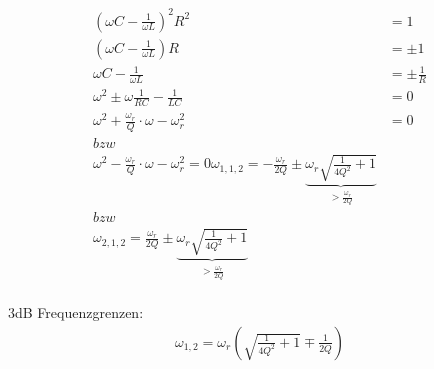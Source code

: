 \begin{align}
	(\omega C-\frac{1}{\omega L})^2R^2 &= 1\nonumber\\
	(\omega C - \frac{1}{\omega L})R &= \pm 1\nonumber\\
	\omega C - \frac{1}{\omega L} &= \pm \frac{1}{R}\nonumber\\
	\omega^2 \pm \omega \frac{1}{RC}-\frac{1}{LC} &= 0\nonumber\\
	\omega^2 + \frac{\omega_r}{Q}\cdot \omega - \omega_r^2&=0 \\ bzw\\ \omega^2 -
	\frac{\omega_r}{Q}\cdot \omega - \omega_r^2=0\nonumber
	\omega_{1,1,2} = -\frac{\omega_r}{2Q} \pm 
	\underbrace{\omega_r\sqrt{\frac{1}{4Q^2}+1}}_{>\frac{\omega_r}{2Q}}
	\\	bzw \\
	\omega_{2,1,2}=\frac{\omega_r}{2Q} \pm
	\underbrace{\omega_r\sqrt{\frac{1}{4Q^2}+1}}_{>\frac{\omega_r}{2Q}} \nonumber\\
\end{align}


3dB Frequenzgrenzen:\\
\begin{align}
\boxed{\omega_{1,2}=\omega_r(\sqrt{\frac{1}{4Q^2}+1}\mp\frac{1}{2Q})}
\end{align}
